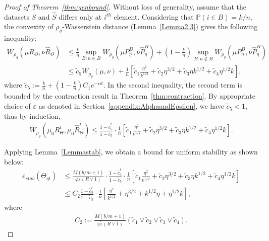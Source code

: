 \documentclass{article}
\begin{document}
\begin{proof}[Proof of Theorem~\ref{thm:genbound}]
	Without loss of generality, assume that the datasets $S$ and $\widehat{S}$ differs only at $i^{th}$ element. Considering that $\mathbb{P}(i \in B) = k/n$, the convexity of $\rho_g$-Wasserstein distance (Lemma~\ref{Lemma2.3}) gives the following inequality:
	\begin{align*}
		W_{\rho_g} (\mu R_\Theta, \nu \widehat{R}_\Theta) &\leq \frac{k}{n} \sup_{B: n \in B} W_{\rho_g} (\mu P_\eta^B, \nu \widehat{P}_\eta^B) + \left(1-\frac{k}{n}\right) \sup_{B: n \notin B} W_{\rho_g} (\mu P_\eta^B, \nu \widehat{P}_\eta^B)\\
		&\leq \tilde{c}_5 W_{\rho_g}(\mu, \nu) + \frac{1}{n} \left[\tilde{c}_1 \frac{\eta^2}{k^{1/2}}  + \tilde{c}_2 \eta^{3/2} + \tilde{c}_3 \eta k^{1/2}  +  \tilde{c}_4 \eta^{1/2} k \right],
	\end{align*}
	where $\tilde{c}_5 := \frac{k}{n} + \left( 1-\frac{k}{n} \right) C_1 e^{-\alpha t} $. In the second inequality, the second term is bounded by the contraction result in Theorem~\ref{thm:contraction}. By appropriate choice of $\varepsilon$ as denoted in Section~\ref{appendix:AlphaandEpsilon}, we have $\tilde{c}_5 <1$, thus by induction,
	\begin{align}
		W_{\rho_g} (\mu_0 R_\Theta^t, \mu_0 \widehat{R}_\Theta^t) \leq \frac{1-\tilde{c}_5^t}{1-\tilde{c}_5} \cdot  \frac{1}{n} \left[\tilde{c}_1 \frac{\eta^2}{k^{1/2}}  + \tilde{c}_2 \eta^{3/2} + \tilde{c}_3 \eta k^{1/2}  +  \tilde{c}_4 \eta^{1/2} k \right].\label{eq:induction}
	\end{align}
        
	Applying Lemma~\ref{Lemmastab}, we obtain a bound for uniform stability as shown below:
	\begin{align*}
		\varepsilon_{stab} (\Theta_{\eta t}) &\leq \frac{M (b/m +1)}{\varphi \varepsilon (R \vee 1)} \cdot \frac{1-\tilde{c}_5^t}{1-\tilde{c}_5} \cdot \frac{1}{n} \left[\tilde{c}_1 \frac{\eta^2}{k^{1/2}}  + \tilde{c}_2 \eta^{3/2} + \tilde{c}_3 \eta k^{1/2}  +  \tilde{c}_4 \eta^{1/2} k \right]\\
		&\leq C_2 \frac{1-\tilde{c}_5^t}{1-\tilde{c}_5} \cdot \frac{1}{n} \left[\frac{\eta^2}{k^{1/2}}  +\eta^{3/2} + k^{1/2}\eta +  \eta^{1/2} k \right],
	\end{align*}
	where
	\begin{align}\label{const:C2}
		C_2 :=\frac{M (b/m +1)}{\varphi \widetilde{\varepsilon} (R \vee 1)} (\tilde{c}_1 \vee \tilde{c}_2 \vee \tilde{c}_3 \vee \tilde{c}_4).
	\end{align}


\end{proof}
\end{document}
